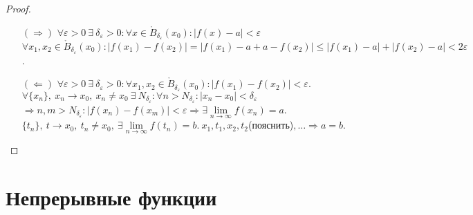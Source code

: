 \documentclass[a4paper, 12pt]{article}
\newcommand{\Bo}{\mathring{B}}
\renewcommand{\epsilon}{\varepsilon}
\newcommand\tab[1][.5cm]{\hspace*{#1}}
\newcommand{\lims}{\lim\limits_{n\to \infty}}
\theoremstyle{definition}
\begin{document}
        \begin{proof}\tab
            \begin{itemize}
                \item[$(\Rightarrow)$] $\forall \epsilon>0\ \exists\ \delta_{\epsilon}>0: \forall x\in \Bo_{\delta_{\epsilon}}(x_0): |f(x)-a|<\epsilon$\\
                $\forall x_1,x_2\in \Bo_{\delta_{\epsilon}}(x_0): |f(x_1)-f(x_2)|=|f(x_1)-a+a-f(x_2)|\leq|f(x_1)-a|+|f(x_2)-a|<2\epsilon$.
                \item[$(\Leftarrow)$] $\forall \epsilon>0\ \exists\ \delta_{\epsilon}>0: \forall x_1,x_2\in \Bo_{\delta_{\epsilon}}(x_0): |f(x_1)-f(x_2)|<\epsilon$.\\
                $\forall \{x_n\},\ x_n\to x_0,\ x_n\ne x_0\ \exists\ N_{\delta_{\epsilon}}: \forall n> N_{\delta_{\epsilon}}: |x_n-x_0|<\delta_{\epsilon}$\\
                $\Rightarrow n,m>N_{\delta_{\epsilon}}: |f(x_n)-f(x_m)|<\epsilon \Rightarrow \exists\lims f(x_n)=a$.\\
                $\{t_n\},\ t\to x_0,\ t_n\ne x_0,\ \exists \lims f(t_n)=b.\ x_1, t_1, x_2, t_2 $(пояснить)$, \dots \Rightarrow a=b$.
            \end{itemize}
        \end{proof} 
    \section{Непрерывные функции}
\end{document}
